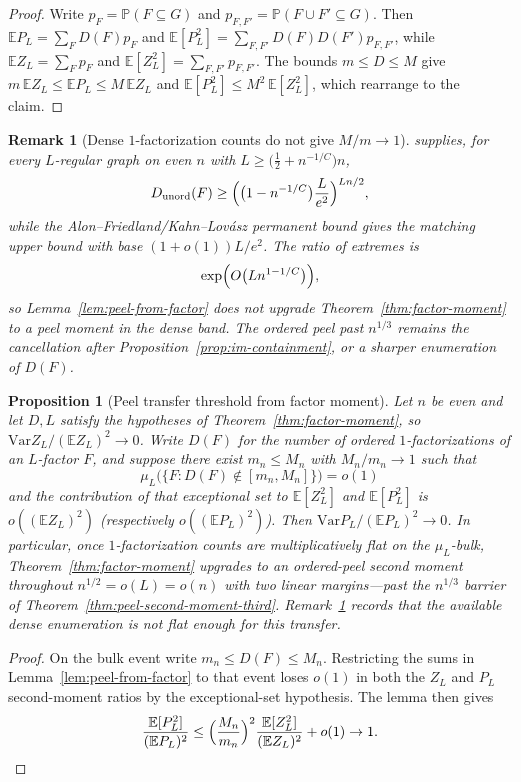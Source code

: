 \documentclass[11pt]{article}
\newtheorem{proposition}[theorem]{Proposition}
\newtheorem{remark}[theorem]{Remark}
\newcommand{\EE}{\mathbb{E}}
\newcommand{\PP}{\mathbb{P}}
\newcommand{\Var}{\mathrm{Var}}
\begin{document}
\begin{proof}
Write \(p_F=\PP(F\subseteq G)\) and \(p_{F,F'}=\PP(F\cup F'\subseteq G)\).
Then \(\EE P_L=\sum_F D(F)p_F\) and
\(\EE[P_L^2]=\sum_{F,F'}D(F)D(F')p_{F,F'}\), while
\(\EE Z_L=\sum_F p_F\) and \(\EE[Z_L^2]=\sum_{F,F'}p_{F,F'}\).
The bounds \(m\le D\le M\) give
\(m\,\EE Z_L\le\EE P_L\le M\,\EE Z_L\) and
\(\EE[P_L^2]\le M^2\,\EE[Z_L^2]\), which rearrange to the claim.
\end{proof}

\begin{remark}[Dense \(1\)-factorization counts do not give \(M/m\to1\)]
\label{rem:fjs-not-flat}
\cite[Theorem~1.2]{FJS19} supplies, for every \(L\)-regular graph on even \(n\)
with \(L\ge\bigl(\tfrac12+n^{-1/C}\bigr)n\),
\[
D_{\mathrm{unord}}(F)
\ge
\Bigl(\bigl(1-n^{-1/C}\bigr)\frac{L}{e^2}\Bigr)^{Ln/2},
\]
while the Alon--Friedland/Kahn--Lov\'asz permanent bound gives the matching
upper bound with base \((1+o(1))L/e^2\). The ratio of extremes is
\[
\exp\Bigl(O\bigl(Ln^{1-1/C}\bigr)\Bigr),
\]
so Lemma~\ref{lem:peel-from-factor} does not upgrade
Theorem~\ref{thm:factor-moment} to a peel moment in the dense band.
The ordered peel past \(n^{1/3}\) remains the cancellation after
Proposition~\ref{prop:im-containment}, or a sharper enumeration of \(D(F)\).
\end{remark}

\begin{proposition}[Peel transfer threshold from factor moment]
\label{prop:peel-transfer-threshold}
Let \(n\) be even and let \(D,L\) satisfy the hypotheses of
Theorem~\ref{thm:factor-moment}, so \(\Var Z_L/(\EE Z_L)^2\to0\). Write
\(D(F)\) for the number of ordered \(1\)-factorizations of an \(L\)-factor \(F\),
and suppose there exist \(m_n\le M_n\) with \(M_n/m_n\to1\) such that
\[
\mu_L\bigl(\{F:D(F)\notin[m_n,M_n]\}\bigr)=o(1)
\]
and the contribution of that exceptional set to \(\EE[Z_L^2]\) and
\(\EE[P_L^2]\) is \(o((\EE Z_L)^2)\) (respectively \(o((\EE P_L)^2)\)).
Then \(\Var P_L/(\EE P_L)^2\to0\).
In particular, once \(1\)-factorization counts are multiplicatively flat on the
\(\mu_L\)-bulk, Theorem~\ref{thm:factor-moment} upgrades to an ordered-peel
second moment throughout \(n^{1/2}=o(L)=o(n)\) with two linear margins---past
the \(n^{1/3}\) barrier of Theorem~\ref{thm:peel-second-moment-third}.
Remark~\ref{rem:fjs-not-flat} records that the available dense
enumeration is not flat enough for this transfer.
\end{proposition}

\begin{proof}
On the bulk event write \(m_n\le D(F)\le M_n\). Restricting the sums in
Lemma~\ref{lem:peel-from-factor} to that event loses \(o(1)\) in both the
\(Z_L\) and \(P_L\) second-moment ratios by the exceptional-set hypothesis.
The lemma then gives
\[
\frac{\EE[P_L^2]}{(\EE P_L)^2}
\le
\Bigl(\frac{M_n}{m_n}\Bigr)^2
\frac{\EE[Z_L^2]}{(\EE Z_L)^2}+o(1)
\to1.
\]
\end{proof}
\end{document}
